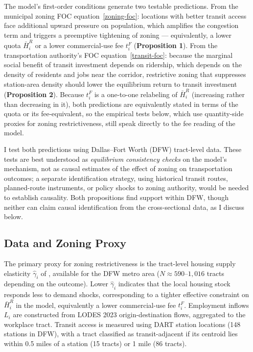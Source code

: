\documentclass[12pt, a4paper]{article}
\theoremstyle{definition}
\begin{document}
The model's first-order conditions generate two testable predictions. From the municipal zoning FOC equation~\eqref{zoning-foc}: locations with better transit access face additional upward pressure on population, which amplifies the congestion term and triggers a preemptive tightening of zoning — equivalently, a lower quota $\bar{H}_i^R$ or a lower commercial-use fee $t_i^F$ (\textbf{Proposition 1}). From the transportation authority's FOC equation~\eqref{transit-foc}: because the marginal social benefit of transit investment depends on ridership, which depends on the density of residents and jobs near the corridor, restrictive zoning that suppresses station-area density should lower the equilibrium return to transit investment (\textbf{Proposition 2}). Because $t_i^F$ is a one-to-one relabeling of $\bar{H}_i^R$ (increasing rather than decreasing in it), both predictions are equivalently stated in terms of the quota or its fee-equivalent, so the empirical tests below, which use quantity-side proxies for zoning restrictiveness, still speak directly to the fee reading of the model.

I test both predictions using Dallas--Fort Worth (DFW) tract-level data. These tests are best understood as \emph{equilibrium consistency checks} on the model's mechanism, not as causal estimates of the effect of zoning on transportation outcomes; a separate identification strategy, using historical transit routes, planned-route instruments, or policy shocks to zoning authority, would be needed to establish causality. Both propositions find support within DFW, though neither can claim causal identification from the cross-sectional data, as I discuss below.

\subsection{Data and Zoning Proxy}

The primary proxy for zoning restrictiveness is the tract-level housing supply elasticity $\hat\gamma_i$ of \citet{Baum-Snow2024-ii}, available for the DFW metro area ($N \approx 590$--$1{,}016$ tracts depending on the outcome). Lower $\hat\gamma_i$ indicates that the local housing stock responds less to demand shocks, corresponding to a tighter effective constraint on $\bar H_i^R$ in the model, equivalently a lower commercial-use fee $t_i^F$. Employment inflows $L_i$ are constructed from LODES 2023 origin-destination flows, aggregated to the workplace tract. Transit access is measured using DART station locations (148 stations in DFW), with a tract classified as transit-adjacent if its centroid lies within 0.5 miles of a station (15 tracts) or 1 mile (86 tracts).
\end{document}

